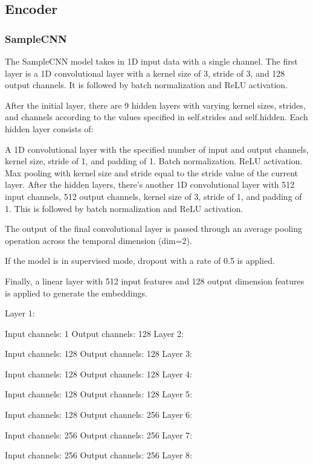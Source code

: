 \subsection{Encoder}
\subsubsection{SampleCNN}

The SampleCNN model takes in 1D input data with a single channel. The first layer is a 1D convolutional layer with a kernel size of 3, stride of 3, and 128 output channels. It is followed by batch normalization and ReLU activation.

After the initial layer, there are 9 hidden layers with varying kernel sizes, strides, and channels according to the values specified in self.strides and self.hidden. Each hidden layer consists of:

A 1D convolutional layer with the specified number of input and output channels, kernel size, stride of 1, and padding of 1.
Batch normalization.
ReLU activation.
Max pooling with kernel size and stride equal to the stride value of the current layer.
After the hidden layers, there's another 1D convolutional layer with 512 input channels, 512 output channels, kernel size of 3, stride of 1, and padding of 1. This is followed by batch normalization and ReLU activation.

The output of the final convolutional layer is passed through an average pooling operation across the temporal dimension (dim=2).

If the model is in supervised mode, dropout with a rate of 0.5 is applied.

Finally, a linear layer with 512 input features and 128 output dimension features is applied to generate the embeddings.



Layer 1:

Input channels: 1
Output channels: 128
Layer 2:

Input channels: 128
Output channels: 128
Layer 3:

Input channels: 128
Output channels: 128
Layer 4:

Input channels: 128
Output channels: 128
Layer 5:

Input channels: 128
Output channels: 256
Layer 6:

Input channels: 256
Output channels: 256
Layer 7:

Input channels: 256
Output channels: 256
Layer 8:

